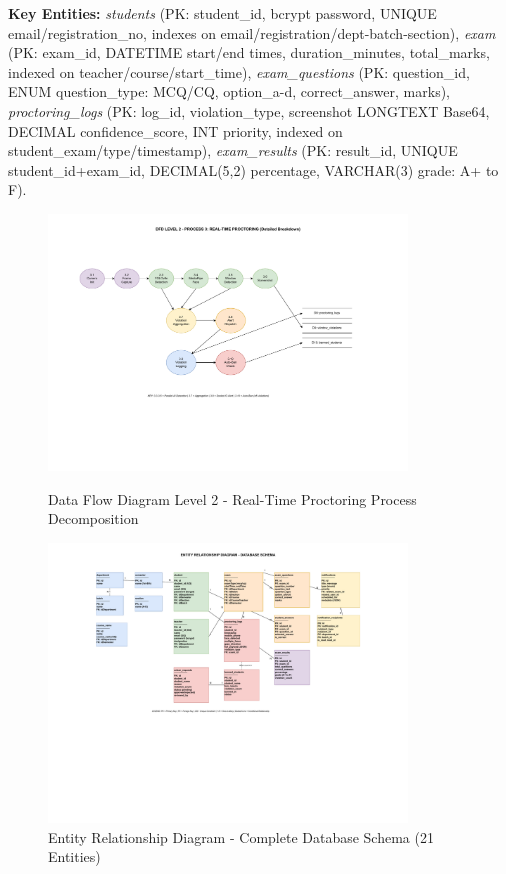 \textbf{Key Entities:} \textit{students} (PK: student\_id, bcrypt password, UNIQUE email/registration\_no, indexes on email/registration/dept-batch-section), \textit{exam} (PK: exam\_id, DATETIME start/end times, duration\_minutes, total\_marks, indexed on teacher/course/start\_time), \textit{exam\_questions} (PK: question\_id, ENUM question\_type: MCQ/CQ, option\_a-d, correct\_answer, marks), \textit{proctoring\_logs} (PK: log\_id, violation\_type, screenshot LONGTEXT Base64, DECIMAL confidence\_score, INT priority, indexed on student\_exam/type/timestamp), \textit{exam\_results} (PK: result\_id, UNIQUE student\_id+exam\_id, DECIMAL(5,2) percentage, VARCHAR(3) grade: A+ to F).

\begin{figure}[p]
    \centering
    \includegraphics[width=0.85\textwidth]{Chap3/dfd_level2}
    \caption{Data Flow Diagram Level 2 - Real-Time Proctoring Process Decomposition}
    \label{fig:dfd2}

    \vspace{1cm}

    \includegraphics[width=0.85\textwidth]{Chap3/er_diagram}
    \caption{Entity Relationship Diagram - Complete Database Schema (21 Entities)}
    \label{fig:er}
\end{figure}

